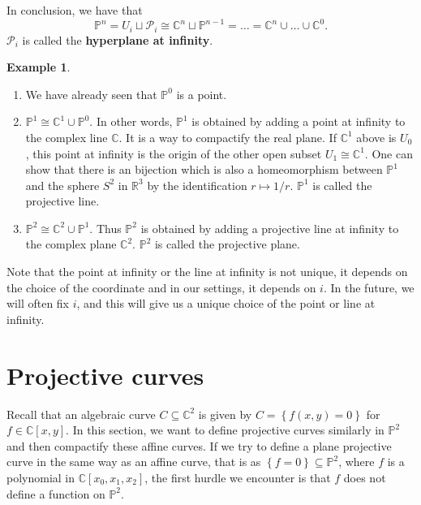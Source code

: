 \documentclass{article}
\newcommand{\R}{\mathbb{R}}
\newcommand{\C}{\mathbb{C}}
\renewcommand{\P}{\mathbb{P}}
\newcommand{\rb}[1]{\left( #1 \right)}
\renewcommand{\sb}[1]{\left[ #1 \right]}
\newcommand{\cb}[1]{\left\{ #1 \right\}}
\theoremstyle{definition}\newtheorem{definition}{Definition}[section]
\theoremstyle{definition}\newtheorem{notation}[definition]{Notation}
\theoremstyle{definition}\newtheorem{remark}[definition]{Remark}
\theoremstyle{definition}\newtheorem{example}[definition]{Example}
\theoremstyle{definition}\newtheorem{fact}{Fact}
\theoremstyle{definition}\newtheorem{exercise}{Exercise}
\begin{document}
In conclusion, we have that
$$ \P^n = U_i \sqcup \mathcal{P}_i \cong \C^n \sqcup \P^{n - 1} = \dots = \C^n \cup \dots \cup \C^0. $$
$ \mathcal{P}_i $ is called the \textbf{hyperplane at infinity}.

\begin{example}
\hfill
\begin{enumerate}
\item We have already seen that $ \P^0 $ is a point.
\item $ \P^1 \cong \C^1 \cup \P^0 $. In other words, $ \P^1 $ is obtained by adding a point at infinity to the complex line $ \C $. It is a way to compactify the real plane. If $ \C^1 $ above is $ U_0 $, this point at infinity is the origin of the other open subset $ U_1 \cong \C^1 $. One can show that there is an bijection which is also a homeomorphism between $ \P^1 $ and the sphere $ S^2 $ in $ \R^3 $ by the identification $ r \mapsto 1 / r $. $ \P^1 $ is called the projective line.
\item $ \P^2 \cong \C^2 \cup \P^1 $. Thus $ \P^2 $ is obtained by adding a projective line at infinity to the complex plane $ \C^2 $. $ \P^2 $ is called the projective plane.
\end{enumerate}
\end{example}

Note that the point at infinity or the line at infinity is not unique, it depends on the choice of the coordinate and in our settings, it depends on $ i $. In the future, we will often fix $ i $, and this will give us a unique choice of the point or line at infinity.


\section{Projective curves}

Recall that an algebraic curve $ C \subseteq \C^2 $ is given by $ C = \cb{f\rb{x, y} = 0} $ for $ f \in \C\sb{x, y} $. In this section, we want to define projective curves similarly in $ \P^2 $ and then compactify these affine curves. If we try to define a plane projective curve in the same way as an affine curve, that is as $ \cb{f = 0} \subseteq \P^2 $, where $ f $ is a polynomial in $ \C\sb{x_0, x_1, x_2} $, the first hurdle we encounter is that $ f $ does not define a function on $ \P^2 $.
\end{document}
